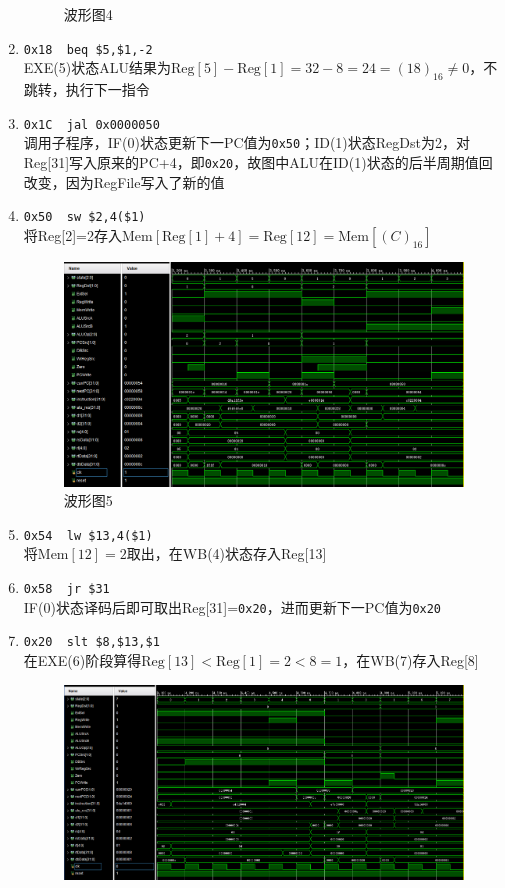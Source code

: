\begin{enumerate}
\begin{figure}[H]
\caption{波形图4}
\label{fig:wave_4}
\end{figure}
    \item \verb'0x18  beq $5,$1,-2'\\
    EXE(5)状态ALU结果为$\mathrm{Reg}[5]-\mathrm{Reg}[1]=32-8=24=(18)_{16}\ne 0$，不跳转，执行下一指令
    \item \verb'0x1C  jal 0x0000050'\\
    调用子程序，IF(0)状态更新下一PC值为\verb'0x50'；ID(1)状态RegDst为2，对Reg[31]写入原来的PC+4，即\verb'0x20'，故图中ALU在ID(1)状态的后半周期值回改变，因为RegFile写入了新的值
    \item \verb'0x50  sw $2,4($1)'\\
    将Reg[2]=2存入$\text{Mem}[\text{Reg}[1]+4]=\text{Reg}[12]=\text{Mem}[(C)_{16}]$
\begin{figure}[H]
\centering
\includegraphics[width=\linewidth]{fig/FullIns/Ins5.PNG}
\caption{波形图5}
\label{fig:wave_5}
\end{figure}
    \item \verb'0x54  lw $13,4($1)'\\
    将$\text{Mem}[12]=2$取出，在WB(4)状态存入Reg[13]
    \item \verb'0x58  jr $31'\\
    IF(0)状态译码后即可取出Reg[31]=\verb'0x20'，进而更新下一PC值为\verb'0x20'
    \item \verb'0x20  slt $8,$13,$1'\\
    在EXE(6)阶段算得$\mathrm{Reg}[13]<\mathrm{Reg}[1]=2<8=1$，在WB(7)存入Reg[8]
\begin{figure}[H]
\centering
\includegraphics[width=\linewidth]{fig/FullIns/Ins6.PNG}

\end{figure}
\end{enumerate}
